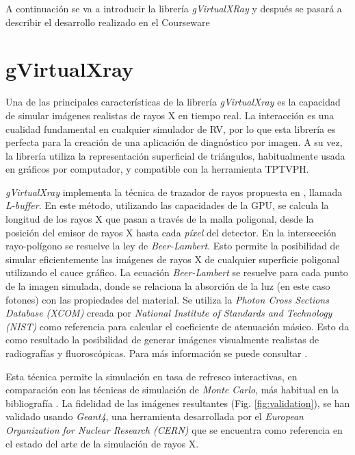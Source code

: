 A continuación se va a introducir la librería \emph{gVirtualXRay} y después se pasará a describir el desarrollo realizado en el \ac{Courseware}


\section{gVirtualXray}
\label{xray:context}

Una de las principales características de la librería \emph{gVirtualXray} es la capacidad de simular imágenes realistas de rayos X en tiempo real. La interacción es una cualidad fundamental en cualquier simulador de \ac{RV}, por lo que esta librería es perfecta para la creación de una aplicación de diagnóstico por imagen. 
A su vez, la librería utiliza la representación superficial de triángulos, habitualmente usada en gráficos por computador, y compatible con la herramienta \ac{TPTVPH}.

\emph{gVirtualXray} implementa la técnica de trazador de rayos propuesta en \cite{Freud2006175}, llamada \emph{L-buffer}. En este método, utilizando las capacidades de la \ac{GPU}, se calcula la longitud de los rayos X que pasan a través de la malla poligonal, desde la posición del emisor de rayos X hasta cada \emph{píxel} del detector. En la intersección rayo-polígono se resuelve la ley de \emph{Beer-Lambert}. Esto permite la posibilidad de simular eficientemente las imágenes de rayos X de cualquier superficie poligonal utilizando el cauce gráfico. La ecuación \emph{Beer-Lambert} se resuelve para cada punto de la imagen simulada, donde se relaciona la absorción de la luz (en este caso fotones) con las propiedades del material.  Se utiliza la \emph{Photon Cross Sections Database (XCOM)} creada por \emph{National Institute of Standards and Technology (NIST)}\cite{XCOM} como referencia para calcular el coeficiente de atenuación másico. Esto da como resultado la posibilidad de generar imágenes visualmente realistas de radiografías y fluoroscópicas. Para más información se puede consultar \cite{vidal2009simulation}.

Esta técnica permite la simulación en tasa de refresco interactivas, en comparación con las técnicas de  simulación de \emph{Monte Carlo}, más habitual en la bibliografía \cite{sujar:hal}. La fidelidad de las imágenes resultantes (Fig. \ref{fig:validation}), se han validado usando \emph{Geant4}, una herramienta desarrollada por el \emph{European Organization for Nuclear Research (CERN)} que se encuentra como referencia en el estado del arte de la simulación de rayos X.

